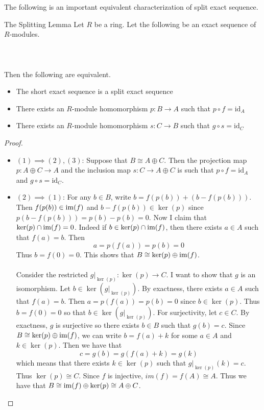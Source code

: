 \documentclass[a4paper]{article}
\begin{document}
The following is an important equivalent characterization of split exact sequence. 

\begin{prp}{The Splitting Lemma}{} Let $R$ be a ring. Let the following be an exact sequence of $R$-modules. \\~\\
\\~\\
Then the following are equivalent. 
\begin{itemize}
\item The short exact sequence is a split exact sequence
\item There exists an $R$-module homomorphism $p:B\to A$ such that $p\circ f=\text{id}_A$
\item There exists an $R$-module homomorphism $s:C\to B$ such that $g\circ s=\text{id}_C$
\end{itemize} \tcbline
\begin{proof}~\\
\begin{itemize}
\item $(1)\implies(2),(3)$: Suppose that $B\cong A\oplus C$. Then the projection map $p:A\oplus C\to A$ and the inclusion map $s:C\to A\oplus C$ is such that $p\circ f=\text{id}_A$ and $g\circ s=\text{id}_C$. 

\item $(2)\implies(1)$: For any $b\in B$, write $b=f(p(b))+(b-f(p(b)))$. Then $f(p(b))\in\operatorname{im}(f)$ and $b-f(p(b))\in\ker(p)$ since $p(b-f(p(b)))=p(b)-p(b)=0$. Now I claim that $\ker(p)\cap\operatorname{im}(f)=0$. Indeed if $b\in\ker(p)\cap\operatorname{im}(f)$, then there exists $a\in A$ such that $f(a)=b$. Then $$a=p(f(a))=p(b)=0$$ Thus $b=f(0)=0$. This shows that $B\cong\ker(p)\oplus\operatorname{im}(f)$. \\~\\

Consider the restricted $g|_{\ker(p)}:\ker(p)\to C$. I want to show that $g$ is an isomorphism. Let $b\in\ker\left(g|_{\ker(p)}\right)$. By exactness, there exists $a\in A$ such that $f(a)=b$. Then $a=p(f(a))=p(b)=0$ since $b\in\ker(p)$. Thus $b=f(0)=0$ so that $b\in\ker\left(g|_{\ker(p)}\right)$. For surjectivity, let $c\in C$. By exactness, $g$ is surjective so there exists $b\in B$ such that $g(b)=c$. Since $B\cong\ker(p)\oplus\operatorname{im}(f)$, we can write $b=f(a)+k$ for some $a\in A$ and $k\in\ker(p)$. Then we have that $$c=g(b)=g(f(a)+k)=g(k)$$ which means that there exists $k\in\ker(p)$ such that $g|_{\ker(p)}(k)=c$. Thus $\ker(p)\cong C$. Since $f$ is injective, $im(f)=f(A)\cong A$. Thus we have that $B\cong\operatorname{im}(f)\oplus\ker(p)\cong A\oplus C$. 


\end{itemize}
\end{proof}
\end{prp}
\end{document}
